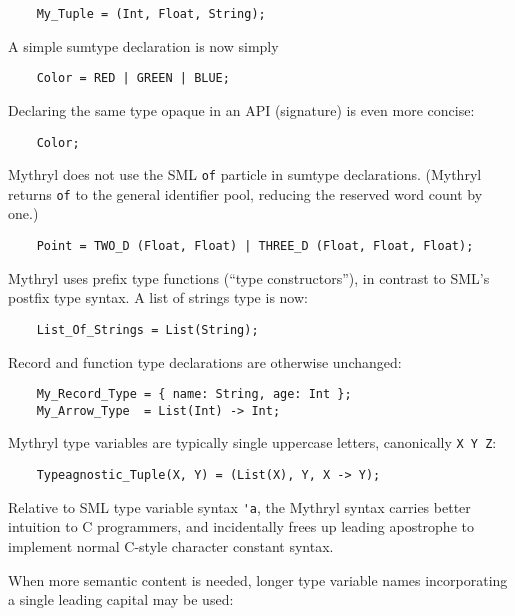 \begin{verbatim}
    My_Tuple = (Int, Float, String);
\end{verbatim}

A simple sumtype declaration is now simply

\begin{verbatim}
    Color = RED | GREEN | BLUE;
\end{verbatim}

Declaring the same type opaque in an API (signature) is even more concise:

\begin{verbatim}
    Color;
\end{verbatim}

Mythryl does not use the {\sc SML} {\tt of} particle in sumtype declarations. 
(Mythryl returns {\tt of} to the general identifier pool, reducing the reserved 
word count by one.)

\begin{verbatim}
    Point = TWO_D (Float, Float) | THREE_D (Float, Float, Float);
\end{verbatim}

Mythryl uses prefix type functions (``type constructors''), in contrast to 
{\sc SML}'s postfix type syntax.  A list of strings type is now:

\begin{verbatim}
    List_Of_Strings = List(String);
\end{verbatim}

Record and function type declarations are otherwise unchanged: 

\begin{verbatim}
    My_Record_Type = { name: String, age: Int };
    My_Arrow_Type  = List(Int) -> Int;
\end{verbatim}

Mythryl type variables are typically single uppercase letters, canonically 
{\tt X Y Z}:

\begin{verbatim}
    Typeagnostic_Tuple(X, Y) = (List(X), Y, X -> Y);
\end{verbatim}

Relative to {\sc SML} type variable syntax \verb|'a|, the Mythryl 
syntax carries better intuition to C programmers, and incidentally 
frees up leading apostrophe to implement normal C-style character 
constant syntax.

When more semantic content is needed, longer type variable names incorporating a 
single leading capital may be used:

